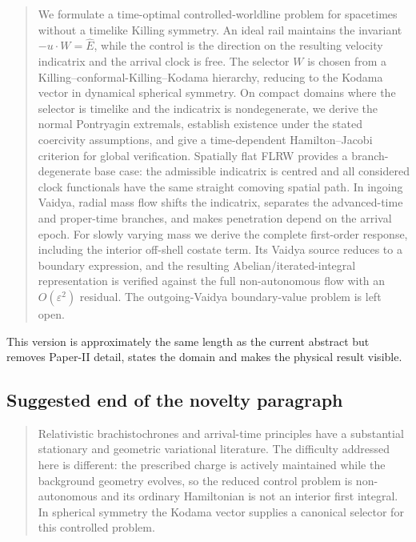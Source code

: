 \documentclass[11pt,a4paper]{article}
\begin{document}
\begin{quote}
We formulate a time-optimal controlled-worldline problem for spacetimes without a timelike
Killing symmetry.  An ideal rail maintains the invariant $-u\cdot W=\hat E$, while the control is
the direction on the resulting velocity indicatrix and the arrival clock is free.  The selector
$W$ is chosen from a Killing--conformal-Killing--Kodama hierarchy, reducing to the Kodama vector in
dynamical spherical symmetry.  On compact domains where the selector is timelike and the
indicatrix is nondegenerate, we derive the normal Pontryagin extremals, establish existence under
the stated coercivity assumptions, and give a time-dependent Hamilton--Jacobi criterion for global
verification.  Spatially flat FLRW provides a branch-degenerate base case: the admissible
indicatrix is centred and all considered clock functionals have the same straight comoving spatial
path.  In ingoing Vaidya, radial mass flow shifts the indicatrix, separates the advanced-time and
proper-time branches, and makes penetration depend on the arrival epoch.  For slowly varying mass
we derive the complete first-order response, including the interior off-shell costate term.  Its
Vaidya source reduces to a boundary expression, and the resulting Abelian/iterated-integral
representation is verified against the full non-autonomous flow with an $O(\varepsilon^2)$
residual.  The outgoing-Vaidya boundary-value problem is left open.
\end{quote}

This version is approximately the same length as the current abstract but removes Paper-II detail,
states the domain and makes the physical result visible.

\subsection{Suggested end of the novelty paragraph}

\begin{quote}
Relativistic brachistochrones and arrival-time principles have a substantial stationary and
geometric variational literature.  The difficulty addressed here is different: the prescribed
charge is actively maintained while the background geometry evolves, so the reduced control
problem is non-autonomous and its ordinary Hamiltonian is not an interior first integral.  In
spherical symmetry the Kodama vector supplies a canonical selector for this controlled problem.
\end{quote}
\end{document}
